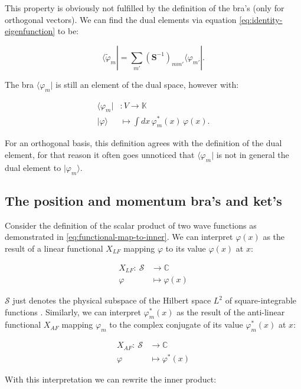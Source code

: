 This property is obviously not fulfilled by the definition of the
bra's (only for orthogonal vectors). We can find the dual elements via
equation \eqref{eq:identity-eigenfunction} to be:

\begin{equation}
\langle\tilde\varphi_m| = \sum_{m'}\left(\mathbf{S}^{-1}\right)_{mm'}\langle\varphi_{m'}|.
\end{equation}

The bra $\langle\varphi_m|$ is still an element of the dual space,
however with:

\begin{align}
\langle\varphi_m|&: V\to\mathbb K\\
|\varphi\rangle &\mapsto \int dx\,\varphi_m^*(x)\,\varphi(x).\label{eq:functional-map-to-inner}
\end{align}

For an orthogonal basis, this definition agrees with the definition of
the dual element, for that reason it often goes unnoticed that $\langle\varphi_m|$ is
not in general the dual element to $|\varphi_m\rangle$.

\subsection*{The position and momentum bra's and ket's}

Consider the definition of the scalar product of two wave functions as
demonstrated in \eqref{eq:functional-map-to-inner}. We can interpret $\varphi(x)$
as the result of a linear functional $X_{LF}$ mapping $\varphi$ to its
value $\varphi(x)$ at $x$:

\begin{align}
X_{LF}:\ \mathcal S &\to \mathbb C\\
\varphi &\mapsto \varphi(x)
\end{align}

$\mathcal S$ just denotes the physical subspace of the Hilbert space
$L^2$ of square-integrable functions \cite{Madrid_2005}. Similarly, we can interpret
$\varphi_m^*(x)$ as the result of the anti-linear functional $X_{AF}$
mapping $\varphi_m$ to the complex conjugate of its value
$\varphi_m^*(x)$ at $x$:

\begin{align}
X_{AF}:\ \mathcal S &\to \mathbb C\\
\varphi &\mapsto \varphi^*(x)
\end{align}

With this interpretation we can rewrite the inner product:

